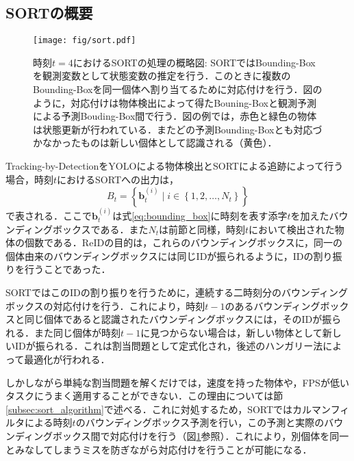     \subsection{SORTの概要}
    \label{subsec:abstract_of_sort}

    \begin{figure}[t]
        \centering
        \texttt{[image: fig/sort.pdf]}
        \caption[時刻$t=4$におけるSORTの処理の概略図]{時刻$t=4$におけるSORTの処理の概略図: SORTではBounding-Boxを観測変数として状態変数の推定を行う．このときに複数のBounding-Boxを同一個体へ割り当てるために対応付けを行う．図のように，対応付けは物体検出によって得たBouning-Boxと観測予測による予測Bouding-Box間で行う．図の例では，赤色と緑色の物体は状態更新が行われている．またどの予測Bounding-Boxとも対応づかなかったものは新しい個体として認識される（黄色）．}
        \label{fig:sort}
    \end{figure}

    Tracking-by-DetectionをYOLOによる物体検出とSORTによる追跡によって行う場合，時刻$t$におけるSORTへの出力は，
    \begin{equation}
        \label{eq:input_to_sort}
        B_t = \left\{\bm{b}_t^{(i)} \mid i \in \left\{1 ,2, \dots, N_t\right\}\right\}
    \end{equation}
    で表される．ここで$\bm{b}_t^{(i)}$は式\ref{eq:bounding_box}に時刻を表す添字$t$を加えたバウンディングボックスである．また$N_t$は前節と同様，時刻$t$において検出された物体の個数である．ReIDの目的は，これらのバウンディングボックスに，同一の個体由来のバウンディングボックスには同じIDが振られるように，IDの割り振りを行うことであった．

    SORTではこのIDの割り振りを行うために，連続する二時刻分のバウンディングボックスの対応付けを行う．これにより，時刻$t-1$のあるバウンディングボックスと同じ個体であると認識されたバウンディングボックスには，そのIDが振られる．また同じ個体が時刻$t-1$に見つからない場合は，新しい物体として新しいIDが振られる．これは割当問題として定式化され，後述のハンガリー法によって最適化が行われる．

    しかしながら単純な割当問題を解くだけでは，速度を持った物体や，FPSが低いタスクにうまく適用することができない．この理由については節\ref{subsec:sort_algorithm}で述べる．これに対処するため，SORTではカルマンフィルタによる時刻$t$のバウンディングボックス予測を行い，この予測と実際のバウンディングボックス間で対応付けを行う（図\ref{fig:sort}参照）．これにより，別個体を同一とみなしてしまうミスを防ぎながら対応付けを行うことが可能になる．

